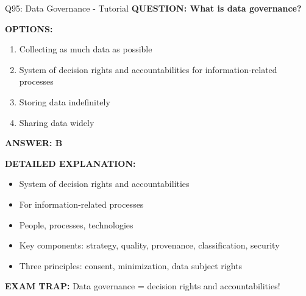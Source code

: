 \documentclass[8pt]{beamer}
\begin{document}
	\begin{frame}{Q95: Data Governance - Tutorial}
		\fontsize{6.5}{7.5}\selectfont
		\textbf{QUESTION: What is data governance?}
		
		\vspace{0.1cm}
		\textbf{OPTIONS:}
		\begin{enumerate}
			\item Collecting as much data as possible
			\item System of decision rights and accountabilities for information-related processes
			\item Storing data indefinitely
			\item Sharing data widely
		\end{enumerate}
		
		\vspace{0.1cm}
		\textcolor{myblue}{\textbf{ANSWER: B}}
		
		\vspace{0.1cm}
		\textbf{DETAILED EXPLANATION:}
		\begin{itemize}
			\item System of decision rights and accountabilities
			\item For information-related processes
			\item People, processes, technologies
			\item Key components: strategy, quality, provenance, classification, security
			\item Three principles: consent, minimization, data subject rights
		\end{itemize}
		
		\vspace{0.1cm}
		\textcolor{myred}{\textbf{EXAM TRAP:}} Data governance = \textcolor{myblue}{decision rights and accountabilities}!
	\end{frame}
	
\end{document}
